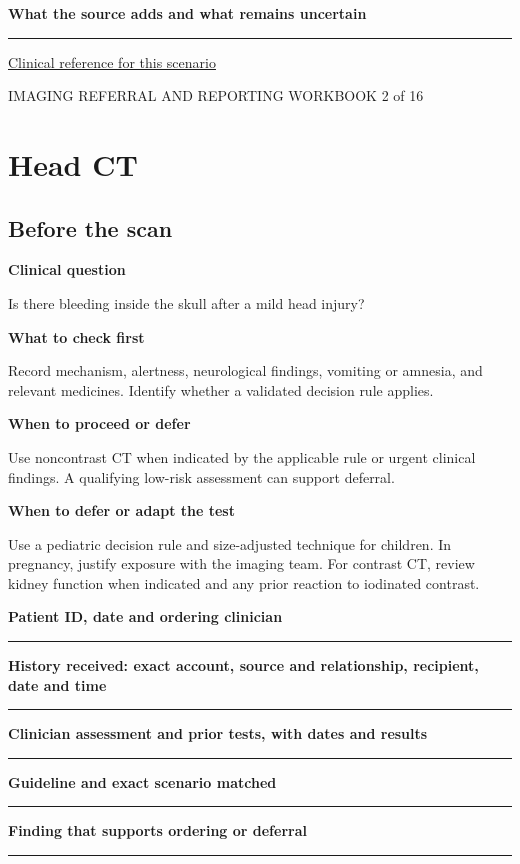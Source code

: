 \documentclass[11pt,a4paper]{article}
\newcommand{\record}[1]{\textbf{#1}\par\vspace{0.55\baselineskip}\hrule\vspace{0.35\baselineskip}}
\begin{document}
\record{What the source adds and what remains uncertain}

\small\href{https://www.radiologyinfo.org/en/info/acs-acute-hand-and-wrist-trauma}{Clinical reference for this scenario}

\normalsize

\newpage

{\small IMAGING REFERRAL AND REPORTING WORKBOOK \hfill 2 of 16}

\section*{Head CT}

\subsection*{Before the scan}

\textbf{Clinical question}\par Is there bleeding inside the skull after a mild head injury?\par

\textbf{What to check first}\par Record mechanism, alertness, neurological findings, vomiting or amnesia, and relevant medicines. Identify whether a validated decision rule applies.\par

\textbf{When to proceed or defer}\par Use noncontrast CT when indicated by the applicable rule or urgent clinical findings. A qualifying low-risk assessment can support deferral.\par

\textbf{When to defer or adapt the test}\par Use a pediatric decision rule and size-adjusted technique for children. In pregnancy, justify exposure with the imaging team. For contrast CT, review kidney function when indicated and any prior reaction to iodinated contrast.\par

\record{Patient ID, date and ordering clinician}

\record{History received: exact account, source and relationship, recipient, date and time}

\record{Clinician assessment and prior tests, with dates and results}

\record{Guideline and exact scenario matched}

\record{Finding that supports ordering or deferral}
\end{document}

